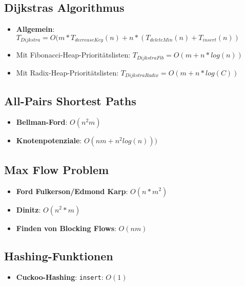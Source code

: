\documentclass[10pt,a4paper]{article}
\begin{document}
	\subsection{Dijkstras Algorithmus}
	\label{lz:sub:dijkstras_algorithmus}
	
	\begin{itemize}
		\item \textbf{Allgemein}: $T_{Dijkstra} = O(m * T_{decreaseKey}(n) + n * (T_{deleteMin}(n) + T_{insert}(n))$
		\item Mit Fibonacci-Heap-Prioritätslisten: $T_{DijkstraFib} = O(m + n * log (n))$
		\item Mit Radix-Heap-Prioritätslisten: $T_{DijkstraRadix} = O(m + n * log (C))$
	\end{itemize}

	\subsection{All-Pairs Shortest Paths}
	\label{lz:sub:all_pairs_shortest_paths}
	
	\begin{itemize}
		\item \textbf{Bellman-Ford}: $O(n^2m)$
		\item \textbf{Knotenpotenziale}: $O(nm + n^2log(n)))$
	\end{itemize}

	\subsection{Max Flow Problem}
	\label{lz:sub:max_flow_problem}
	
	\begin{itemize}
		\item \textbf{Ford Fulkerson/Edmond Karp}: $O(n * m^2)$
		\item \textbf{Dinitz}: $O(n^2 * m)$
		\item \textbf{Finden von Blocking Flows}: $O(nm)$
	\end{itemize}

	\subsection{Hashing-Funktionen}
	\label{lz:sub:hashing_funktionen}
	
	\begin{itemize}
		\item \textbf{Cuckoo-Hashing}: \texttt{insert}: $O(1)$
	\end{itemize}
\end{document}

